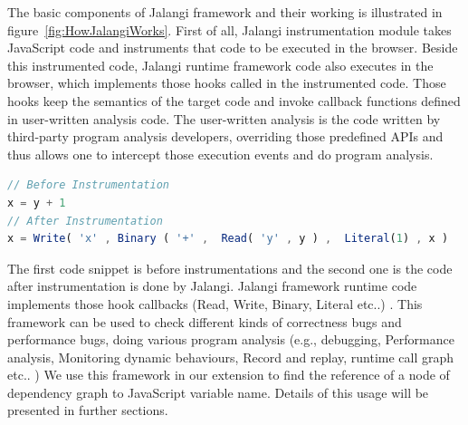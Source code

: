 The basic components of Jalangi framework and their working is illustrated in figure~\ref{fig:HowJalangiWorks}. First of all, Jalangi instrumentation module takes JavaScript code and instruments that code to be executed in the browser. Beside this instrumented code, Jalangi runtime framework code also executes in the browser, which implements those hooks called in the instrumented code. Those hooks keep the semantics of the target code and invoke callback functions defined in user-written analysis code. The user-written analysis is the code written by third-party program analysis developers, overriding those predefined APIs and thus allows one to intercept those execution events and do program analysis.
\begin{lstlisting}[language=JavaScript, caption=Jalangi Instrumentation]
// Before Instrumentation
x = y + 1
// After Instrumentation
x = Write( 'x' , Binary ( '+' ,  Read( 'y' , y ) ,	Literal(1) , x )
\end{lstlisting}

The first code snippet is before instrumentations and the second one is the code after instrumentation is done by Jalangi. Jalangi framework runtime code implements those hook callbacks (Read, Write, Binary, Literal etc..) .
This framework can be used to check different kinds of correctness bugs and performance bugs, doing various program analysis (e.g., debugging, Performance analysis, Monitoring dynamic behaviours, Record and replay, runtime call graph etc.. )
We use this framework in our extension to find the reference of a node of dependency graph to JavaScript variable name. Details of this usage will be presented in further sections.

